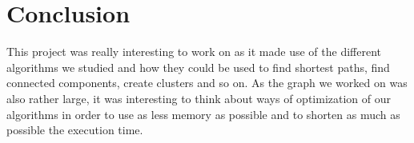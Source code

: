 \documentclass{article}
\begin{document}
\section{Conclusion}

This project was really interesting to work on as it made use of the different algorithms we studied and how they could be used to find shortest paths, find connected components, create clusters and so on. As the graph we worked on was also rather large, it was interesting to think about ways of optimization of our algorithms in order to use as less memory as possible and to shorten as much as possible the execution time.

\newpage

\thispagestyle{empty}
\listoffigures
\end{document}
